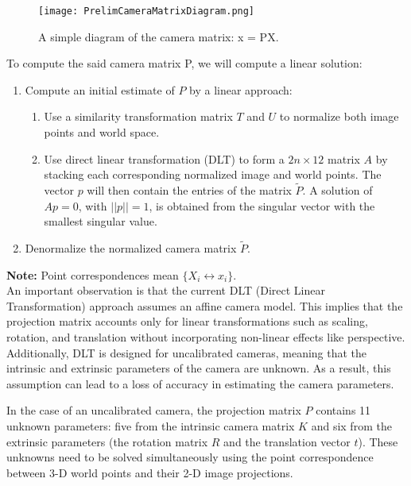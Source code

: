 \documentclass[12pt]{article}
\begin{document}
\begin{figure}[ht]
    \centering
    \texttt{[image: PrelimCameraMatrixDiagram.png]}
    \caption{A simple diagram of the camera matrix: x = PX.}
\end{figure}

\noindent To compute the said camera matrix P, we will compute a linear solution:
\begin{enumerate}
    \item Compute an initial estimate of \( P \) by a linear approach: \begin{enumerate}
        \item Use a similarity transformation matrix \( T \) and \( U \) to normalize both image points and world space.
        \item Use direct linear transformation (DLT) to form a \( 2n \times 12 \) matrix \( A \) by stacking each corresponding normalized image and world points. The vector \( p \) will then contain the entries of the matrix \( \tilde{P} \). A solution of \( Ap = 0 \), with \( ||p|| = 1 \), is obtained from the singular vector with the smallest singular value.
    \end{enumerate}

    \item Denormalize the normalized camera matrix \( \tilde{P} \).
\end{enumerate}

\noindent \textbf{Note:} Point correspondences mean \( \{ X_i \leftrightarrow x_i \} \).\\

An important observation is that the current DLT (Direct Linear Transformation) approach assumes an affine camera model. This implies that the projection matrix accounts only for linear transformations such as scaling, rotation, and translation without incorporating non-linear effects like perspective. Additionally, DLT is designed for uncalibrated cameras, meaning that the intrinsic and extrinsic parameters of the camera are unknown. As a result, this assumption can lead to a loss of accuracy in estimating the camera parameters.

In the case of an uncalibrated camera, the projection matrix \( P \) contains 11 unknown parameters: five from the intrinsic camera matrix \( K \) and six from the extrinsic parameters (the rotation matrix \( R \) and the translation vector \( t \)). These unknowns need to be solved simultaneously using the point correspondence between 3-D world points and their 2-D image projections.
\end{document}
